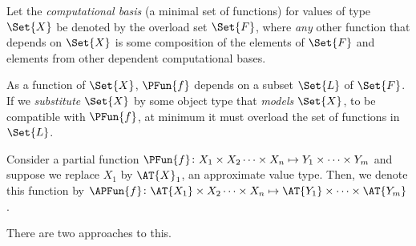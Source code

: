 \documentclass[ ../main.tex]{subfiles}
\begin{document}
	Let the \emph{computational basis} (a minimal set of functions) for values of type $\Set{X}$ be denoted by the overload set $\Set{F}$, where \emph{any} other function that depends on $\Set{X}$ is some composition of the elements of $\Set{F}$ and elements from other dependent computational bases.
	
	As a function of $\Set{X}$, $\PFun{f}$ depends on a subset $\Set{L}$ of $\Set{F}$.
	If we \emph{substitute} $\Set{X}$ by some object type that \emph{models} $\Set{X}$, to be compatible with $\PFun{f}$, at minimum it must overload the set of functions in $\Set{L}$.
	

Consider a partial function $\PFun{f} \colon X_1 \times X_2 \cdots \times X_n \mapsto Y_1 \times \cdots \times Y_m$ and suppose we replace $X_1$ by $\AT{X}_1$, an approximate value type.
Then, we denote this function by $\APFun{f} \colon \AT{X_1} \times X_2 \cdots \times X_n \mapsto \AT{Y_1} \times \cdots \times \AT{Y_m}$.
	
There are two approaches to this.

	
\end{document}
